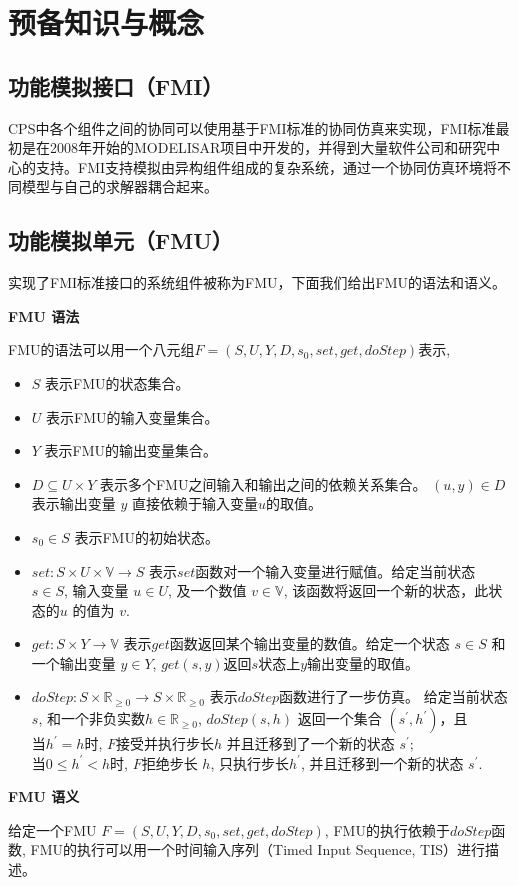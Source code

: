 \chapter{预备知识与概念}
\label{ch2}
\section{功能模拟接口（FMI）}
CPS中各个组件之间的协同可以使用基于FMI标准的协同仿真来实现，FMI标准最初是在2008年开始的MODELISAR项目中开发的，并得到大量软件公司和研究中心的支持。FMI支持模拟由异构组件组成的复杂系统，通过一个协同仿真环境将不同模型与自己的求解器耦合起来。
\section{功能模拟单元（FMU）}
实现了FMI标准接口的系统组件被称为FMU，下面我们给出FMU的语法和语义。
\begin{define}
\textbf{FMU 语法}

FMU的语法可以用一个八元组$F=(S,U,Y,D,s_{0},set,get,doStep)$表示, 
\end{define}
\begin{itemize}
\item
$S$ 表示FMU的状态集合。
\item
$U$ 表示FMU的输入变量集合。
\item
$Y$ 表示FMU的输出变量集合。
\item
$D \subseteq U \times Y$ 表示多个FMU之间输入和输出之间的依赖关系集合。 $(u,y) \in D $表示输出变量 $y$ 直接依赖于输入变量$u$的取值。 
\item
$s_{0} \in S$ 表示FMU的初始状态。
\item
$set : S \times U \times \mathbb{V} \rightarrow S$ 表示$set$函数对一个输入变量进行赋值。给定当前状态 $s \in S$, 输入变量 $u \in U$, 及一个数值 $v \in \mathbb{V}$, 该函数将返回一个新的状态，此状态的$u$ 的值为 $v$.
\item
$get : S \times Y \rightarrow \mathbb{V}$ 表示$get$函数返回某个输出变量的数值。给定一个状态 $s \in S$ 和一个输出变量 $y \in Y$, $get(s,y)$返回$s$状态上$y$输出变量的取值。
\item
$doStep : S \times \mathbb{R}_{\geqslant{0}} \rightarrow S \times \mathbb{R}_{\geqslant{0}}$ 表示$doStep$函数进行了一步仿真。 给定当前状态 $s$, 和一个非负实数$h \in \mathbb{R}_{\geqslant{0}}$, $doStep(s,h)$ 返回一个集合 $(s^{\prime},h^{\prime})$，且
\\
    当$h^{\prime} = h$时, $F$接受并执行步长$h$ 并且迁移到了一个新的状态 $s^{\prime}$;
\\
    当$0 \leqslant h^{\prime} < h$时, $F$拒绝步长 $h$, 只执行步长$h^{\prime}$, 并且迁移到一个新的状态 $s^{\prime}$.
\end{itemize}
\begin{define}
\textbf{FMU 语义}
\end{define} 
给定一个FMU $F=(S,U,Y,D,s_{0},set,get,doStep)$, FMU的执行依赖于$doStep$函数, FMU的执行可以用一个时间输入序列（Timed Input Sequence, TIS）进行描述。

